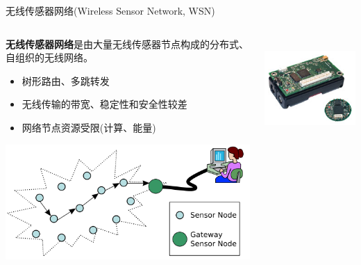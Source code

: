 \documentclass[mathserif,compress,CJKutf8, red]{beamer}
\newcommand{\wuhao}{\fontsize{10.5pt}{\baselineskip}\selectfont}    %
\newcommand{\liuhao}{\fontsize{7.875pt}{\baselineskip}\selectfont}  %
\begin{document}
\begin{CJK*}{UTF8}{song}
\begin{frame}{无线传感器网络(Wireless Sensor Network, WSN)}
\begin{columns}
  \begin{column}{0.7\textwidth}
   \textbf{无线传感器网络}是由大量无线传感器节点构成的分布式、自组织的无线网络。
   \wuhao \begin{itemize}
    \item 树形路由、多跳转发
    \item 无线传输的带宽、稳定性和安全性较差
    \item 网络节点资源受限(计算、能量)
    \end{itemize}
   \includegraphics[width=\textwidth]{images/wsn.png}
  \end{column}
  \begin{column}{0.3\textwidth}
   \centering \liuhao{mica2, mica2dot(伯克利)}\\
   \includegraphics[width=.9\textwidth]{images/mica_family.jpg}\\
   \liuhao{FLOWS3(清华)}\\

\end{column}
\end{columns}
\end{frame}
\end{CJK*}
\end{document}
